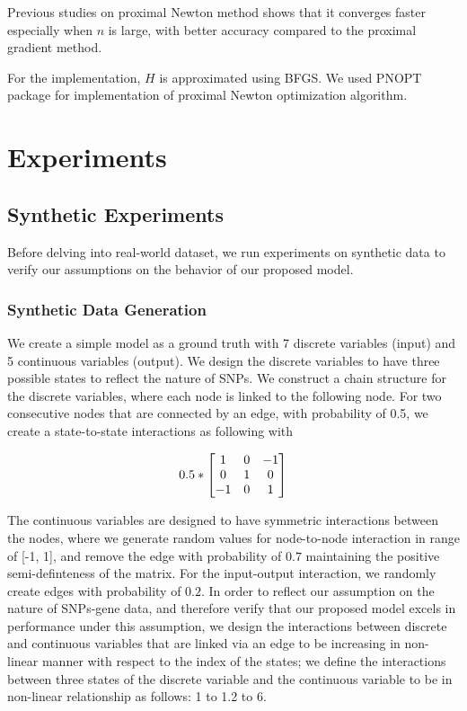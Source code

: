 \documentclass{article}
\begin{document}
Previous studies on proximal Newton method \cite{lee2012proximal} shows that it converges faster especially when $n$ is large, with better accuracy compared to the proximal gradient method.

For the implementation, $H$ is approximated using BFGS.
We used PNOPT package \cite{lee2012proximal} for implementation of proximal Newton optimization algorithm.



\section{Experiments}


\subsection{Synthetic Experiments}
Before delving into real-world dataset, we run experiments on synthetic data to verify our assumptions on the behavior of our proposed model.


\subsubsection{Synthetic Data Generation}
We create a simple model as a ground truth with 7 discrete variables (input) and 5 continuous variables (output).
We design the discrete variables to have three possible states to reflect the nature of SNPs. We construct a chain structure for the discrete variables, where each node is linked to the following node. For two consecutive nodes that are connected by an edge, with probability of 0.5, we create a state-to-state interactions as following with 

\begin{align*}
\centering
0.5 * 
\begin{bmatrix}
  1 & 0 & -1 \\
  0 & 1 & 0 \\
  -1 & 0 & 1
\end{bmatrix}
\end{align*}

The continuous variables are designed to have symmetric interactions between the nodes, where we generate random values for node-to-node interaction in range of [-1, 1], and remove the edge with probability of $0.7$ maintaining the positive semi-definteness of the matrix. 
For the input-output interaction, we randomly create edges with probability of $0.2$. 
In order to reflect our assumption on the nature of SNPs-gene data, and therefore verify that our proposed model excels in performance under this assumption, we design the interactions between discrete and continuous variables that are linked via an edge to be increasing in non-linear manner with respect to the index of the states;
we define the interactions between three states of the discrete variable and the continuous variable to be in non-linear relationship as follows: 1 to 1.2 to 6.
\end{document}
